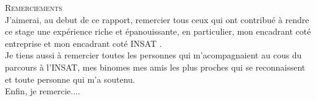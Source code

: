 
\thispagestyle{plain}

\begin{center}
    \huge \textsc{Remerciements}\\[2cm]
    \large
        J'aimerai, au debut de ce rapport, remercier tous ceux qui ont contribué
        à rendre ce stage une expérience riche et épanouissante, en particulier,
        mon encadrant coté entreprise \mentor{} et mon encadrant coté INSAT \correspondent.\\[1cm]


        Je tiens aussi à remercier toutes les personnes qui m'acompagnaient au cous du parcours à l'INSAT, mes binomes
        mes amis les plus proches qui se reconnaissent et toute personne qui m'a soutenu.\\[1cm]


        Enfin, je remercie....\\[1cm]
\end{center}
